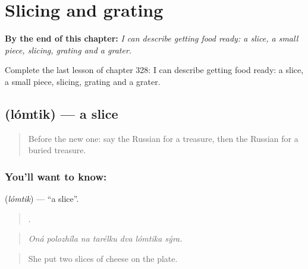 
\chapter{Slicing and grating}
\label{ch:ru-slicing-and-grating}

\begin{chapteropening}
\textbf{By the end of this chapter:} \emph{I can describe getting food ready: a slice, a small piece, slicing, grating and a grater.}

Complete the last lesson of chapter 328: I can describe getting food ready: a slice, a small piece, slicing, grating and a grater.
\end{chapteropening}

\section[\texorpdfstring{\ru{ломтик} (lómtik)}{ломтик (lómtik)}]{ (lómtik) — a slice}

\label{lesson:RU-C328-lomtik}



\begin{quote}
Before the new one: say the Russian for a treasure, then the Russian for a buried treasure.
\end{quote}

\subsection*{You'll want to know: }
\textbf{} (\emph{lómtik}) — \textquotedblleft{}a slice\textquotedblright{}.

\begin{quote}
      .
\end{quote}

\begin{quote}
\emph{Oná polozhíla na tarélku dva lómtika sýra.}
\end{quote}

\begin{quote}
She put two slices of cheese on the plate.
\end{quote}

